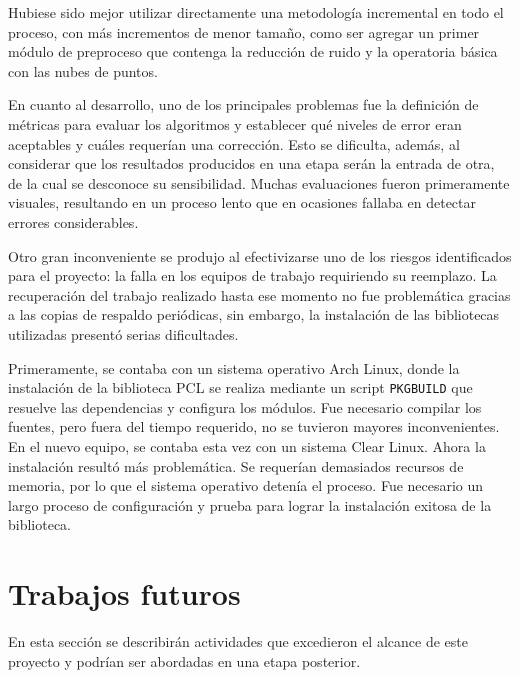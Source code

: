 Hubiese sido mejor utilizar directamente una metodología incremental en todo el
proceso, con más incrementos de menor tamaño, como ser agregar un primer módulo
de preproceso que contenga la reducción de ruido y la operatoria básica con las
nubes de puntos.

En cuanto al desarrollo, uno de los principales problemas fue la definición de
métricas para evaluar los algoritmos y establecer qué niveles de error eran
aceptables y cuáles requerían una corrección.
Esto se dificulta, además, al considerar que los resultados producidos en una etapa
serán la entrada de otra, de la cual se desconoce su sensibilidad.
Muchas evaluaciones fueron primeramente visuales, resultando en un proceso lento
que en ocasiones fallaba en detectar errores considerables.

Otro gran inconveniente se produjo al efectivizarse uno de los riesgos
identifi\-cados para el proyecto: la falla en los equipos de trabajo
requiriendo su reemplazo.
La recuperación del trabajo realizado hasta ese momento no fue problemática
gracias a las copias de respaldo periódicas, sin embargo, la instalación de las bibliotecas
utilizadas presentó serias dificultades.

Primeramente, se contaba con un sistema operativo Arch Linux, donde la
instalación de la biblioteca PCL se realiza mediante un script
\texttt{PKGBUILD} que resuelve las dependencias y configura los módulos.  Fue
necesario compilar los fuentes, pero fuera del tiempo requerido, no se tuvieron
mayores inconvenientes.  En el nuevo equipo, se contaba esta vez con un sistema
Clear Linux.  Ahora la instalación resultó más problemática.  Se requerían
demasiados recursos de memoria, por lo que el sistema operativo detenía el
proceso.  Fue necesario un largo proceso de configuración y prueba para lograr
la instalación exitosa de la biblioteca.

%



\section{Trabajos futuros}
En esta sección se describirán actividades que excedieron el alcance de este proyecto
y podrían ser abordadas en una etapa posterior.

